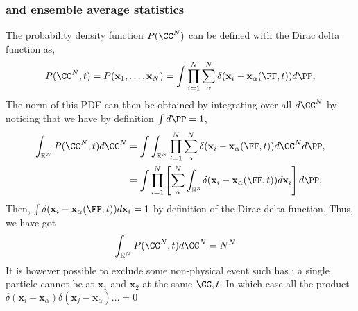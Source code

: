 \subsubsection*{\citet{batchelor1972sedimentation} and \citet{zhang1994ensemble} ensemble average statistics}

The probability density function $P(\CC^N)$ can be defined with the Dirac delta function as, 
\begin{equation*}
    P(\CC^N,t)
    =
    P(\textbf{x}_1,\ldots,\textbf{x}_N)
    = \int 
    \prod_{i=1}^{N}\sum_{\alpha}^{N}\delta(\textbf{x}_i - \textbf{x}_\alpha(\FF,t))
    d\PP,
\end{equation*}
The norm of this PDF can then be obtained by integrating over all $d\CC^N$ by noticing that we have by definition $\int d\PP = 1$, 
\begin{align*}
    \int_{\mathbb{R}^N} P(\CC^N,t) d\CC^N
    &= 
    \int 
    \int_{\mathbb{R}^N}
    \prod_{i=1}^{N}
    \sum_{\alpha}^{N}
    \delta(\textbf{x}_i - \textbf{x}_\alpha(\FF,t))
    d\CC^N
    d\PP,\\
    &= 
    \int 
    \prod_{i=1}^{N}\left[
    \sum_{\alpha}^{N}
    \int_{\mathbb{R}^3}
    \delta(\textbf{x}_i - \textbf{x}_\alpha(\FF,t))
    d\textbf{x}_i\right]
    d\PP,
\end{align*}
Then, $\int \delta(\textbf{x}_i - \textbf{x}_\alpha(\FF,t)) d\textbf{x}_i= 1$ by definition of the Dirac delta function. 
Thus, we have got 
\begin{align*}
    \int_{\mathbb{R}^N} P(\CC^N,t) d\CC^N
    &= 
    N^N
\end{align*}
It is however possible to exclude some non-physical event such has : a single particle cannot be at $\textbf{x}_1$ and $\textbf{x}_2$ at the same $\CC,t$. 
In which case all the product $\delta(\textbf{x}_i - \textbf{x}_\alpha)\delta(\textbf{x}_j - \textbf{x}_\alpha)\ldots  = 0$

